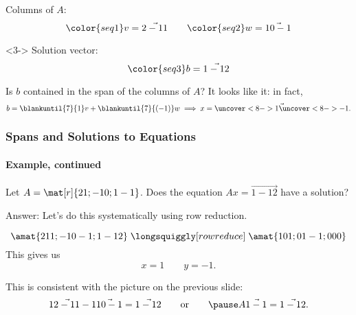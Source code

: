 \begin{frame}
\begin{center}
\begin{tikzpicture}[myxyz, scale=0.5,
    thin border nodes, baseline]
\end{tikzpicture}
\qquad
\begin{minipage}[c]{0.5\textwidth}
  Columns of $A$:
  \[ \color{seq1} v = \vec{2 -1 1} \qquad 
  \color{seq2} w = \vec{1 0 -1} \]
  \begin{uncoverenv}<3->
    Solution vector:
    \[ \color{seq3} b = \vec{1 -1 2} \]
  \end{uncoverenv}
\end{minipage}
\end{center}

\pause[5]
Is $b$ contained in the span of the columns of $A$?
\pause
It looks like it: in fact,
\[ b = \blankuntil{7}{1} v + \blankuntil{7}{(-1)}w
\implies
x = \vec{\uncover<8->1 \uncover<8->{{-1}}}.
 \]

\end{frame}



\begin{frame}
\frametitle{Spans and Solutions to Equations}
\framesubtitle{Example, continued}

\vskip-3mm
\begin{ques}
  Let $A = \mat[r]{2 1; -1 0; 1 -1}$.
  Does the equation $Ax = \vec{1 -1 2}$ have a solution?
\end{ques}

\medskip
\alert{Answer:}
Let's do this systematically using row reduction.
\begin{webonly}
  \[ \amat{2 1 1; -1 0 -1; 1 -1 2}
  \;\longsquiggly[row reduce]\;
  \amat{1 0 1; 0 1 -1; 0 0 0} \]
This gives us
\[ x = 1\qquad y = -1. \]
\end{webonly}

\pause
This is consistent with the picture on the previous slide:
\[ 1\vec{2 -1 1} -1\vec{1 0 -1} = \vec{1 -1 2}
\qquad\text{or}\qquad\pause
A\vec{1 -1} = \vec{1 -1 2}. \]

\end{frame}



